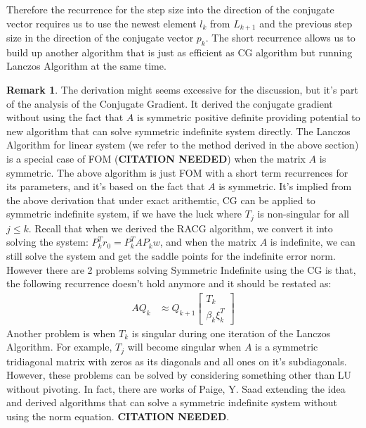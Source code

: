 \documentclass[]{article}
\theoremstyle{definition}
\newtheorem{remark}{Remark}[subsection]
\begin{document}
            Therefore the recurrence for the step size into the direction of the conjugate vector requires us to use the newest element $l_k$ from $L_{k + 1}$ and the previous step size in the direction of the conjugate vector $p_k$. The short recurrence allows us to build up another algorithm that is just as efficient as CG algorithm but running Lanczos Algorithm at the same time. 
            \begin{remark}
                The derivation might seems excessive for the discussion, but it's part of the analysis of the Conjugate Gradient. It derived the conjugate gradient without using the fact that $A$ is symmetric positive definite providing potential to new algorithm that can solve symmetric indefinite system directly. The Lanczos Algorithm for linear system (we refer to the method derived in the above section) is a special case of FOM (\textbf{CITATION NEEDED}) when the matrix $A$ is symmetric. The above algorithm is just FOM with a short term recurrences for its parameters, and it's based on the fact that $A$ is symmetric. It's implied from the above derivation that under exact arithemtic, CG can be applied to symmetric indefinite system, if we have the luck where $T_j$ is non-singular for all $j\le k$. Recall that when we derived the RACG algorithm, we convert it into solving the system: $P^T_kr_0 = P_k^TAP_kw$, and when the matrix $A$ is indefinite, we can still solve the system and get the saddle points for the indefinite error norm. However there are 2 problems solving Symmetric Indefinite using the CG is that, the following recurrence doesn't hold anymore and it should be restated as: 
                \begin{align}
                    AQ_k &\approx Q_{k + 1}
                    \begin{bmatrix}
                        T_k \\ \beta_k \xi_k^T
                    \end{bmatrix}
                \end{align}
                Another problem is when $T_k$ is singular during one iteration of the Lanczos Algorithm. For example, $T_j$ will become singular when $A$ is a symmetric tridiagonal matrix with zeros as its diagonals and all ones on it's subdiagonals. However, these problems can be solved by considering something other than LU without pivoting. In fact, there are works of Paige, Y. Saad extending the idea and derived algorithms that can solve a symmetric indefinite system without using the norm equation. 
                \textbf{CITATION NEEDED}. 
            \end{remark}
        
\end{document}
